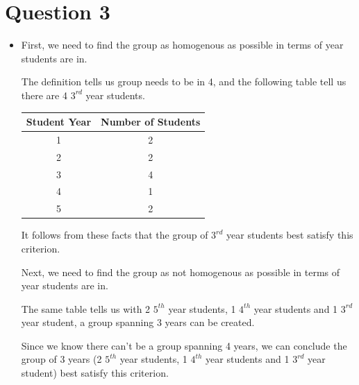 \documentclass[12pt]{article}
\begin{document}
\section*{Question 3}
\begin{itemize}
    \item

    First, we need to find the group as homogenous as possible in terms of year students
    are in.

    \bigskip

    The definition tells us group needs to be in 4,
    and the following table tell us there are 4 $3^{rd}$ year students.

    \bigskip

    \begin{center}
        \begin{tabular}{|c|c|}
            \hline
            Student Year & Number of Students\\
            \hline
            1 & 2\\
            \hline
            2 & 2\\
            \hline
            3 & 4\\
            \hline
            4 & 1\\
            \hline
            5 & 2\\
            \hline
        \end{tabular}
    \end{center}

    \bigskip

    It follows from these facts that the group of $3^{rd}$ year students best satisfy
    this criterion.

    \bigskip

    Next, we need to find the group as not homogenous as possible in terms of year students
    are in.

    \bigskip

    The same table tells us with 2 $5^{th}$ year students, 1 $4^{th}$
    year students and 1 $3^{rd}$ year student, a group spanning 3 years can be
    created.

    \bigskip

    Since we know there can't be a group spanning 4 years, we can conclude the
    group of 3 years (2 $5^{th}$ year students, 1 $4^{th}$ year students and 1
    $3^{rd}$ year student) best satisfy this criterion.

\end{itemize}
\end{document}
